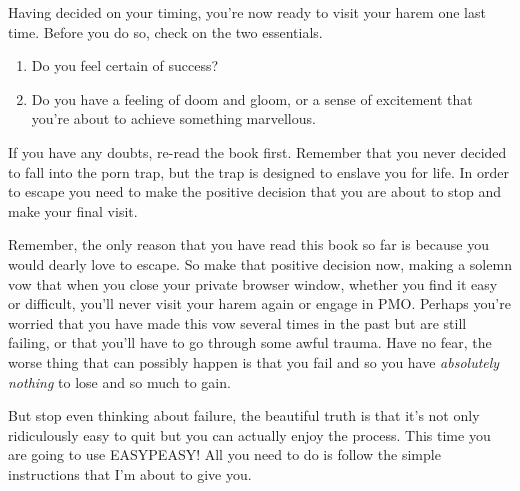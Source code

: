 \documentclass[easypeasy.tex]{subfiles}
\begin{document}
Having decided on your timing, you're now ready to visit your harem one last time. Before you do so, check on the two essentials.
\begin{enumerate}
  \item Do you feel certain of success?
  \item Do you have a feeling of doom and gloom, or a sense of excitement that you're about to achieve something marvellous.
\end{enumerate}

If you have any doubts, re-read the book first. Remember that you never decided to fall into the porn trap, but the trap is designed to enslave you for life. In order to escape you need to make the positive decision that you are about to stop and make your final visit.

Remember, the only reason that you have read this book so far is because you would dearly love to escape. So make that positive decision now, making a solemn vow that when you close your private browser window, whether you find it easy or difficult, you'll never visit your harem again or engage in PMO. Perhaps you're worried that you have made this vow several times in the past but are still failing, or that you'll have to go through some awful trauma. Have no fear, the worse thing that can possibly happen is that you fail and so you have \textit{absolutely nothing} to lose and so much to gain.

But stop even thinking about failure, the beautiful truth is that it's not only ridiculously easy to quit but you can actually enjoy the process. This time you are going to use EASYPEASY! All you need to do is follow the simple instructions that I'm about to give you.
\end{document}

